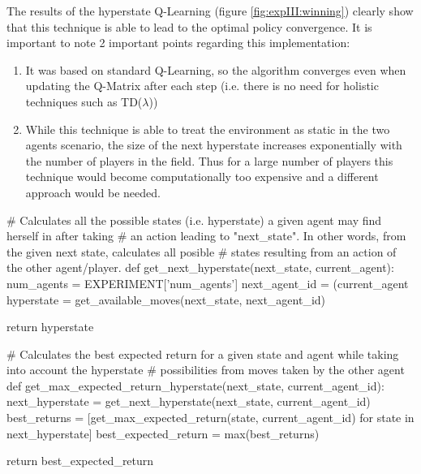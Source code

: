 \documentclass[10pt]{article}
\begin{document}
    The results of the hyperstate Q-Learning (figure \ref{fig:expIII:winning}) clearly show that this technique is able to lead to the optimal policy convergence. It is important to note 2 important points regarding this implementation:
    \begin{enumerate}[1)]
        \item It was based on standard Q-Learning, so the algorithm converges even when updating the Q-Matrix after each step (i.e. there is no need for holistic techniques such as TD($\lambda$))
        \item While this technique is able to treat the environment as static in the two agents scenario, the size of the next hyperstate increases exponentially with the number of players in the field. Thus for a large number of players this technique would become computationally too expensive and a different approach would be needed.
    \end{enumerate}

    \begin{python}[t]
# Calculates all the possible states (i.e. hyperstate) a given agent may find herself in after taking
# an action leading to "next_state". In other words, from the given next state, calculates all posible
# states resulting from an action of the other agent/player.
def get_next_hyperstate(next_state, current_agent):
    num_agents = EXPERIMENT['num_agents']
    next_agent_id = (current_agent %
    hyperstate = get_available_moves(next_state, next_agent_id)

    return hyperstate

# Calculates the best expected return for a given state and agent while taking into account the hyperstate
# possibilities from moves taken by the other agent
def get_max_expected_return_hyperstate(next_state, current_agent_id):
    next_hyperstate = get_next_hyperstate(next_state, current_agent_id)
    best_returns = [get_max_expected_return(state, current_agent_id) for state in next_hyperstate]
    best_expected_return = max(best_returns)

    return best_expected_return
    \end{python}
    \begin{lstlisting}[caption=Implementation code for Hyperstate - Best expected return calculation, label=lst:hyperstate]
    \end{lstlisting}
\end{document}
